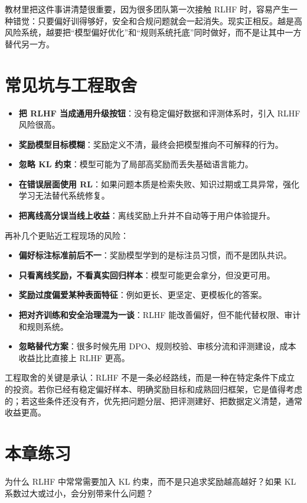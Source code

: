 教材里把这件事讲清楚很重要，因为很多团队第一次接触 RLHF 时，容易产生一种错觉：只要偏好训得够好，安全和合规问题就会一起消失。现实正相反。越是高风险系统，越要把“模型偏好优化”和“规则系统托底”同时做好，而不是让其中一方替代另一方。

\section{常见坑与工程取舍}
\begin{itemize}
  \item \textbf{把 RLHF 当成通用升级按钮}：没有稳定偏好数据和评测体系时，引入 RLHF 风险很高。
  \item \textbf{奖励模型目标模糊}：奖励定义不清，最终会把模型推向不可解释的行为。
  \item \textbf{忽略 KL 约束}：模型可能为了局部高奖励而丢失基础语言能力。
  \item \textbf{在错误层面使用 RL}：如果问题本质是检索失败、知识过期或工具异常，强化学习无法替代系统修复。
  \item \textbf{把离线高分误当线上收益}：离线奖励上升并不自动等于用户体验提升。
\end{itemize}

再补几个更贴近工程现场的风险：
\begin{itemize}
  \item \textbf{偏好标注标准前后不一}：奖励模型学到的是标注员习惯，而不是团队共识。
  \item \textbf{只看离线奖励，不看真实回归样本}：模型可能更会拿分，但没更可用。
  \item \textbf{奖励过度偏爱某种表面特征}：例如更长、更坚定、更模板化的答案。
  \item \textbf{把对齐训练和安全治理混为一谈}：RLHF 能改善偏好，但不能代替权限、审计和规则系统。
  \item \textbf{忽略替代方案}：很多时候先用 DPO、规则校验、审核分流和评测建设，成本收益比比直接上 RLHF 更高。
\end{itemize}

工程取舍的关键是承认：RLHF 不是一条必经路线，而是一种在特定条件下成立的投资。若你已经有稳定偏好样本、明确奖励目标和成熟回归框架，它是值得考虑的；若这些条件还没有齐，优先把问题分层、把评测建好、把数据定义清楚，通常收益更高。

\section{本章练习}
\begin{exercise}[KL 的作用]
为什么 RLHF 中常常需要加入 KL 约束，而不是只追求奖励越高越好？如果 KL 系数过大或过小，会分别带来什么问题？
\end{exercise}

